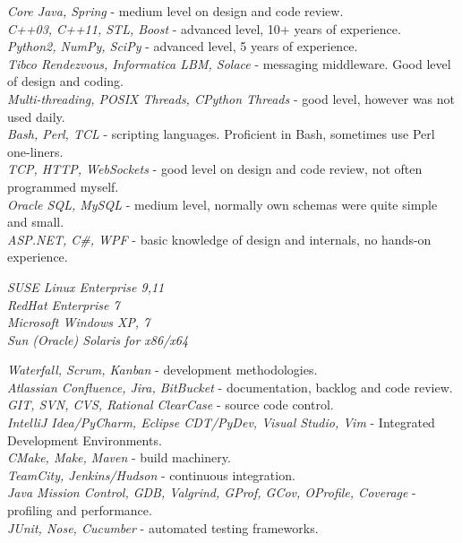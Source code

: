 \documentclass[10pt]{article} %
\begin{document}
{
\textit{Core Java, Spring} - medium level on design and code review.\\
\textit{C++03, C++11, STL, Boost} - advanced level, 10+ years of experience.\\
\textit{Python2, NumPy, SciPy} - advanced level, 5 years of experience.\\
\textit{Tibco Rendezvous, Informatica LBM, Solace} - messaging middleware. Good level of design and coding.\\
\textit{Multi-threading, POSIX Threads, CPython Threads} - good level, however was not used daily.\\
\textit{Bash, Perl, TCL} - scripting languages. Proficient in Bash, sometimes use Perl one-liners.\\
\textit{TCP, HTTP, WebSockets} - good level on design and code review, not often programmed myself.\\
\textit{Oracle SQL, MySQL} - medium level, normally own schemas were quite simple and small.\\
\textit{ASP.NET, C\#, WPF} - basic knowledge of design and internals, no hands-on experience.\\
}


{
\textit{SUSE Linux Enterprise 9,11}\\
\textit{RedHat Enterprise 7}\\
\textit{Microsoft Windows XP, 7}\\
\textit{Sun (Oracle) Solaris for x86/x64}
}


{
\textit{Waterfall, Scrum, Kanban} - development methodologies.\\
\textit{Atlassian Confluence, Jira, BitBucket} - documentation, backlog and code review.\\
\textit{GIT, SVN, CVS, Rational ClearCase} - source code control.\\
\textit{IntelliJ Idea/PyCharm, Eclipse CDT/PyDev, Visual Studio, Vim} - Integrated Development Environments.\\
\textit{CMake, Make, Maven} - build machinery.\\
\textit{TeamCity, Jenkins/Hudson} - continuous integration.\\
\textit{Java Mission Control, GDB, Valgrind, GProf, GCov, OProfile, Coverage} - profiling and performance.\\ 
\textit{JUnit, Nose, Cucumber} - automated testing frameworks.\\
}
\end{document}
